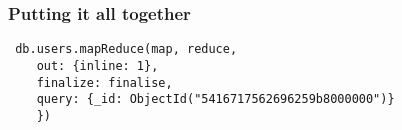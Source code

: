 \documentclass[10pt]{beamer}
\begin{document}
\begin{frame}[fragile]
  \frametitle{Putting it all together}

 \begin{verbatim}
 db.users.mapReduce(map, reduce,
    out: {inline: 1},
    finalize: finalise,
    query: {_id: ObjectId("5416717562696259b8000000")}
    })
 \end{verbatim}

\end{frame}
\end{document}
